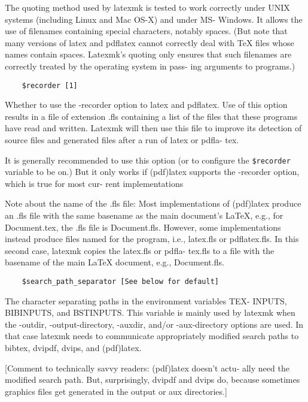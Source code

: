 The quoting method used by latexmk is tested to  work  correctly under  UNIX
systems (including Linux and Mac OS-X) and under MS- Windows.  It allows the
use  of  filenames  containing  special characters, notably spaces.  (But note
that many versions of latex and pdflatex cannot correctly  deal  with  TeX
files  whose names  contain spaces.  Latexmk's quoting only ensures that such
filenames are correctly treated by the operating system in pass- ing arguments
to programs.)

\begin{verbatim}
	$recorder [1]
\end{verbatim}

Whether  to  use the -recorder option to latex and pdflatex. Use
of this option results in a file of extension .fls containing  a
list  of  the  files  that these programs have read and written.
Latexmk will then use this file  to  improve  its  detection  of
source  files and generated files after a run of latex or pdfla-
tex.

It is generally recommended to use this option (or to  configure the \verb|$recorder|
variable to be on.)  But it only works if (pdf)latex supports the -recorder
option, which is true for  most  cur- rent implementations

Note  about  the  name of the .fls file: Most implementations of (pdf)latex
produce an .fls file with the same  basename  as  the main  document's LaTeX,
e.g., for Document.tex, the .fls file is Document.fls.  However,  some
implementations  instead  produce files  named  for  the program, i.e.,
latex.fls or pdflatex.fls.  In this second case, latexmk  copies  the
latex.fls  or  pdfla- tex.fls  to a file with the basename of the main LaTeX
document, e.g., Document.fls.

\begin{verbatim}
	$search_path_separator [See below for default]
\end{verbatim}

The character separating paths in the environment variables TEX-
INPUTS,  BIBINPUTS, and BSTINPUTS.  This variable is mainly used
by latexmk when the -outdir, -output-directory, -auxdir,  and/or
-aux-directory  options are used.  In that case latexmk needs to
communicate  appropriately  modified  search  paths  to  bibtex,
dvipdf, dvips, and (pdf)latex.

[Comment  to technically savvy readers: (pdf)latex doesn't actu-
ally need the modified search path.  But,  surprisingly,  dvipdf
and  dvips do, because sometimes graphics files get generated in
the output or aux directories.]

